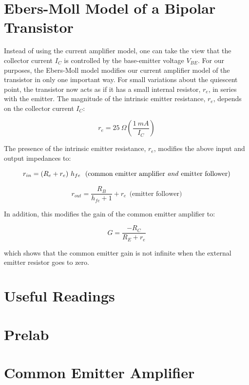 \documentclass[10pt]{PhysLab1C} %
\begin{document}
\section{Ebers-Moll Model of a Bipolar Transistor}

Instead of using the current amplifier model, one can take the view that the collector current $I_C$ is controlled by
the base-emitter voltage $V_{BE}$. For our purposes, the Ebers-Moll model modifies our current amplifier model of
the transistor in only one important way. For small variations about the quiescent point, the transistor now
acts as if it has a small internal resistor, $r_e$, in series with the emitter. The magnitude of the intrinsic emitter
resistance, $r_e$, depends on the collector current $I_C$:

$$r_e = 25~\Omega \left(\frac{1~mA}{I_C}\right)$$

The presence of the intrinsic emitter resistance, $r_e$, modifies the above input and output impedances to:
 
$$r_{in} = (R_e + r_e)~h_{fe}~~ \text{(common emitter amplifier \textit{and} emitter follower)}$$
 
$$r_{out} = \frac{R_B}{h_{fe}+1}+r_e~~ \text{(emitter follower)}$$
 
In addition, this modifies the gain of the common emitter amplifier to:

$$G = \frac{-R_C}{R_E+r_e}$$

which shows that the common emitter gain is not infinite when the external emitter resistor goes to zero.


\section{Useful Readings}


\section{Prelab}


\section{Common Emitter Amplifier}

\end{document}
